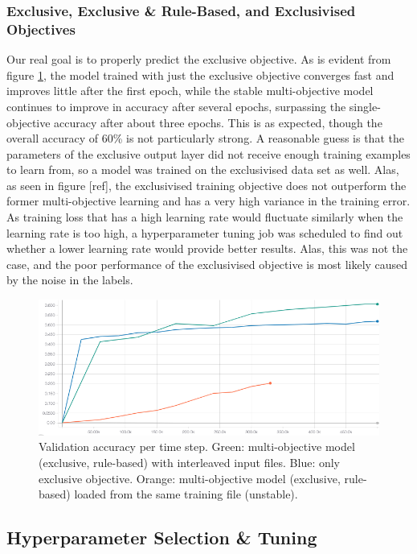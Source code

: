 \subsubsection{Exclusive, Exclusive \& Rule-Based, and Exclusivised Objectives}

Our real goal is to properly predict the exclusive objective.
As is evident from figure \ref{ex_vs_joint}, the model trained with just the exclusive objective converges fast and improves little after the first epoch, while the stable multi-objective model continues to improve in accuracy after several epochs, surpassing the single-objective accuracy after about three epochs.
This is as expected, though the overall accuracy of 60\% is not particularly strong.
A reasonable guess is that the parameters of the exclusive output layer did not receive enough training examples to learn from, so a model was trained on the exclusivised data set as well.
Alas, as seen in figure [ref], the exclusivised training objective does not outperform the former multi-objective learning and has a very high variance in the training error.
As training loss that has a high learning rate would fluctuate similarly when the learning rate is too high, a hyperparameter tuning job was scheduled to find out whether a lower learning rate would provide better results.
Alas, this was not the case, and the poor performance of the exclusivised objective is most likely caused by the noise in the labels.

\begin{figure}
  \includegraphics[width=\linewidth]{figures/multiobj/ex_vs_joint}
  \caption{Validation accuracy per time step. Green: multi-objective model (exclusive, rule-based) with interleaved input files. Blue: only exclusive objective. Orange: multi-objective model (exclusive, rule-based) loaded from the same training file (unstable).}
  \label{ex_vs_joint}
\end{figure}

\subsection{Hyperparameter Selection \& Tuning}
\label{tuning}

